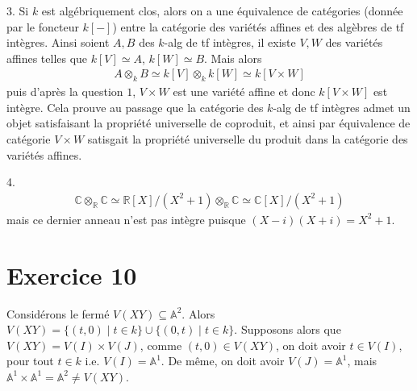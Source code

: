         \begin{question}{3.}
            Si $k$ est algébriquement clos, alors on a une équivalence de catégories (donnée par le foncteur $k[-]$) entre la catégorie des variétés affines et des algèbres de tf intègres. Ainsi soient $A,B$ des $k$-alg de tf intègres, il existe $V,W$ des variétés affines telles que $k[V] \simeq A$, $k[W] \simeq B$. Mais alors
            \begin{align*}
                A \otimes_k B \simeq k[V] \otimes_k k[W] \simeq k[V \times W]
            \end{align*}
            puis d'après la question $1$, $V \times W$ est une variété affine et donc $k[V \times W]$ est intègre. Cela prouve au passage que la catégorie des $k$-alg de tf intègres admet un objet satisfaisant la propriété universelle de coproduit, et ainsi par équivalence de catégorie $V \times W$ satisgait la propriété universelle du produit dans la catégorie des variétés affines.
        \end{question}
        \begin{question}{4.}
            \begin{align*}
                \mathbb{C} \otimes_\mathbb{R} \mathbb{C} \simeq \mathbb{R}[X]/(X^2 + 1) \otimes_\mathbb{R} \mathbb{C} \simeq \mathbb{C}[X]/(X^2 + 1)
            \end{align*}
            mais ce dernier anneau n'est pas intègre puisque $(X - i)(X + i) = X^2 + 1$.
        \end{question}

    \section{Exercice 10}
        Considérons le fermé $V(XY) \subseteq \mathbb{A}^2$. Alors $V(XY) = \{(t,0) \mid t \in k\} \cup \{(0,t) \mid t \in k\}$. Supposons alors que $V(XY) = V(I) \times V(J)$, comme $(t,0) \in V(XY)$, on doit avoir $t \in V(I)$, pour tout $t \in k$ i.e. $V(I) = \mathbb{A}^1$. De même, on doit avoir $V(J) = \mathbb{A}^1$, mais $\mathbb{A}^1 \times \mathbb{A}^1 = \mathbb{A}^2 \neq V(XY)$.

